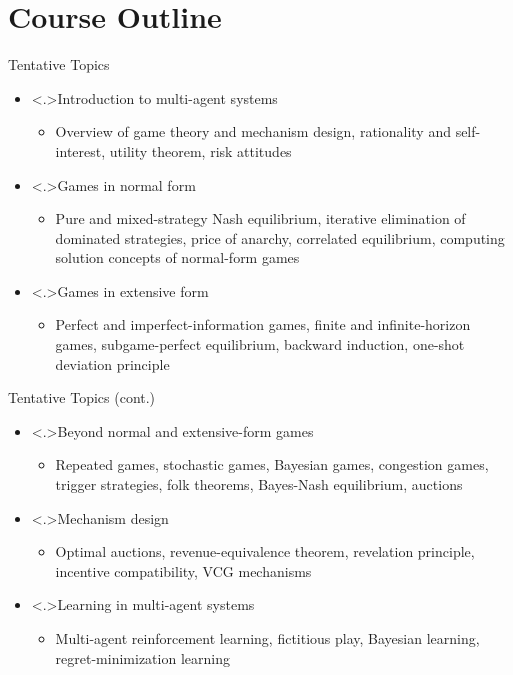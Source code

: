 \documentclass[11pt,aspectratio=169]{beamer}
\begin{document}
 \section{Course Outline}
  \begin{frame}{Tentative Topics}
   \begin{itemize}[<+->]
    \setlength{\itemsep}{1em}
    \item\alert<.>{Introduction to multi-agent systems}
    \begin{itemize}[<.->]
     \item Overview of game theory and mechanism design, rationality and self-interest, utility theorem, risk attitudes
    \end{itemize}
    \item\alert<.>{Games in normal form}
    \begin{itemize}[<.->]
     \item Pure and mixed-strategy Nash equilibrium, iterative elimination of dominated strategies, price of anarchy, correlated equilibrium, computing solution concepts of normal-form games
    \end{itemize}
    \item\alert<.>{Games in extensive form}
    \begin{itemize}[<.->]
     \item Perfect and imperfect-information games, finite and infinite-horizon games, subgame-perfect equilibrium, backward induction, one-shot deviation principle
    \end{itemize}
   \end{itemize}
  \end{frame}
 
  \begin{frame}{Tentative Topics (cont.)}
   \begin{itemize}[<+->]
    \setlength{\itemsep}{1em}
    \item\alert<.>{Beyond normal and extensive-form games}
    \begin{itemize}[<.->]
     \item Repeated games, stochastic games, Bayesian games, congestion games, trigger strategies, folk theorems, Bayes-Nash equilibrium, auctions
    \end{itemize}
    \item\alert<.>{Mechanism design}
    \begin{itemize}[<.->]
     \item Optimal auctions, revenue-equivalence theorem, revelation principle, incentive compatibility, VCG mechanisms
    \end{itemize}
    \item\alert<.>{Learning in multi-agent systems}
    \begin{itemize}[<.->]
     \item Multi-agent reinforcement learning, fictitious play, Bayesian learning, regret-minimization learning
    \end{itemize}
   \end{itemize}
  \end{frame}
 
\end{document}
